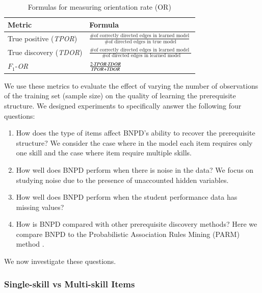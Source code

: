 \documentclass{edm_template}
\begin{document}
{	
	\begin{table}[th]
		\centering
		\caption{Formulas for measuring orientation rate (OR) \label{tbl:or}}
		\label{my-label}
		\begin{tabular}{@{}ll@{}}
			\toprule
			Metric & Formula \\ \midrule
			True positive  (\emph{TPOR}) & $\frac{ \text{\# of correctly directed edges in learned model} } {\text{ \# of directed edges in true model}}$  \\
			True discovery   (\emph{TDOR})& $\frac{ \text{\# of correctly directed edges in learned model } }{\text{ \# of directed edges in learned model}} $\\
			$F_1$-\textit{OR} &  $\frac{  2\cdot \text{\emph{TPOR}} \cdot \text{\emph{TDOR}} }{\text{\emph{TPOR}}+\text{\emph{TDOR}}}$ \\
			\bottomrule
		\end{tabular}
	\end{table}
	
	We use these metrics to evaluate the effect of varying the  number of observations  of the training set (sample size) on the quality of learning the prerequisite structure.
	We designed experiments to specifically answer the following four questions:
	\begin{enumerate}[noitemsep,topsep=2pt,parsep=0pt,partopsep=0pt]
		\item How does the type of items affect BNPD's ability to recover the prerequisite structure?
		We consider the case where in the model each item requires only one skill and the case where item require multiple skills. 
		\item How well does BNPD perform when there is noise in the data?
		We focus on studying noise due to the presence of unaccounted hidden variables.%
		\item How well does BNPD perform when the student performance data has missing values?
		\item How is BNPD compared with other prerequisite discovery methods?
		Here we compare BNPD to the Probabilistic Association Rules Mining (PARM) method \cite{chen2015discovering}.
	\end{enumerate}
	We now investigate these questions.


	\subsubsection{Single-skill vs Multi-skill Items}
	
}
\end{document}
